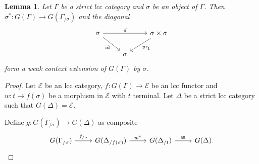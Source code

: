 \documentclass{article}
\newtheorem{lemma}{Lemma}
\theoremstyle{remark}
\theoremstyle{definition}
\begin{document}
\begin{lemma}
  \label{lem:slice-is-weak-ext}
  Let $\Gamma$ be a strict lcc category and $\sigma$ be an object of $\Gamma$.
  Then $\sigma^* : G(\Gamma) \rightarrow G(\Gamma_{/ \sigma})$ and the diagonal
  \begin{equation}
    \begin{tikzcd}
      \sigma \arrow[rr, "d"] \arrow[dr, "\mathrm{id}"'] & & \sigma \times \sigma \arrow[dl, "\mathrm{pr}_1"] \\
      & \sigma
    \end{tikzcd}
  \end{equation}
  form a weak context extension of $G(\Gamma)$ by $\sigma$.
\end{lemma}
\begin{proof}
  Let $\mathcal{E}$ be an lcc category, $f : G(\Gamma) \rightarrow \mathcal{E}$ be an lcc functor and $w : t \rightarrow f(\sigma)$ be a morphism in $\mathcal{E}$ with $t$ terminal.
  Let $\Delta$ be a strict lcc category such that $G(\Delta) = \mathcal{E}$.

  Define $g : G(\Gamma_{/ \sigma}) \rightarrow G(\Delta)$ as composite
  \begin{equation}
    \begin{tikzcd}
      G(\Gamma_{/ \sigma}) \arrow[r, "f_{/ \sigma}"] & G(\Delta_{/ f(\sigma)}) \arrow[r, "w^*"] & G(\Delta_{/ t}) \arrow[r, "\cong"] & G(\Delta).
    \end{tikzcd}
  \end{equation}


\end{proof}
\end{document}
